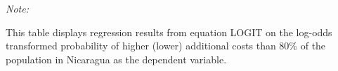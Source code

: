 \begin{table}[htbp!]
\begin{adjustbox}{width = 1\textwidth, max height = 0.95\textheight, center}
\begin{threeparttable}[b]
         \begin{tablenotes}\item \medskip \textit{Note:}
            \item This table displays regression results from equation LOGIT on the log-odds transformed probability of higher (lower) additional costs than 80\% of the population in Nicaragua as the dependent variable. 
         \end{tablenotes}
      \end{threeparttable}
   \end{adjustbox}
\end{table}


